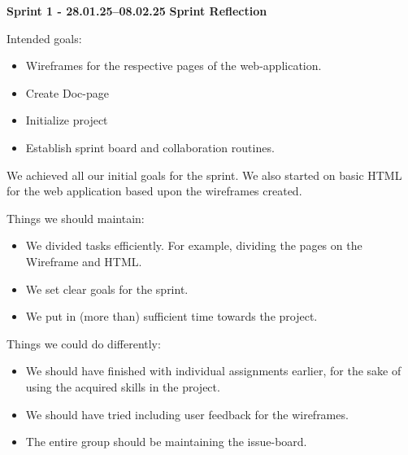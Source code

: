 \documentclass{article}
\begin{document}
\textbf{Sprint 1 - 28.01.25–08.02.25} 
\textbf{Sprint Reflection} 


Intended goals:
\begin{itemize}
    \item Wireframes for the respective pages of the web-application.
    \item Create Doc-page
    \item Initialize project
\item Establish sprint board and collaboration routines.
\end{itemize}

We achieved all our initial goals for the sprint. We also started on basic HTML for the web application based upon the wireframes created. 

Things we should maintain:
\begin{itemize}
    \item We divided tasks efficiently. For example, dividing the pages on the Wireframe and HTML.
    \item We set clear goals for the sprint.
    \item We put in (more than) sufficient time towards the project.
\end{itemize}

Things we could do differently:
\begin{itemize}
    \item We should have finished with individual assignments earlier, for the sake of using the acquired skills in the project.
    \item We should have tried including user feedback for the wireframes.
    \item The entire group should be maintaining the issue-board.
\end{itemize}
\end{document}
